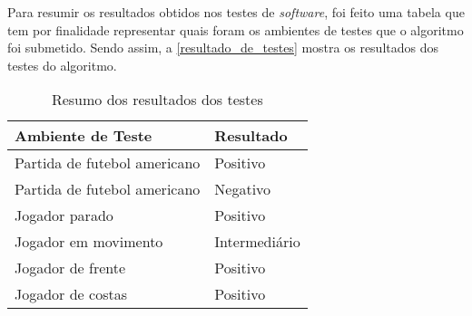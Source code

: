 Para resumir os resultados obtidos nos testes de \textit{software}, foi feito uma tabela que tem por finalidade representar quais foram os ambientes de testes que o algoritmo foi submetido. Sendo assim, a \autoref{resultado_de_testes} mostra os resultados dos testes do algoritmo.

\begin{table}[h]
\centering
\caption{Resumo dos resultados dos testes}
\label{resultado_de_testes}
\begin{tabular}{l|l} 
\hline
\hline
\multicolumn{1}{l|}{Ambiente de Teste} & \multicolumn{1}{l}{Resultado}  \\ 
\hline
Partida de futebol americano & Positivo\\
Partida de futebol americano & Negativo\\
Jogador parado & Positivo\\
Jogador em movimento & Intermediário\\
Jogador de frente & Positivo\\
Jogador de costas & Positivo\\
\hline
\hline 
\end{tabular}
\end{table}